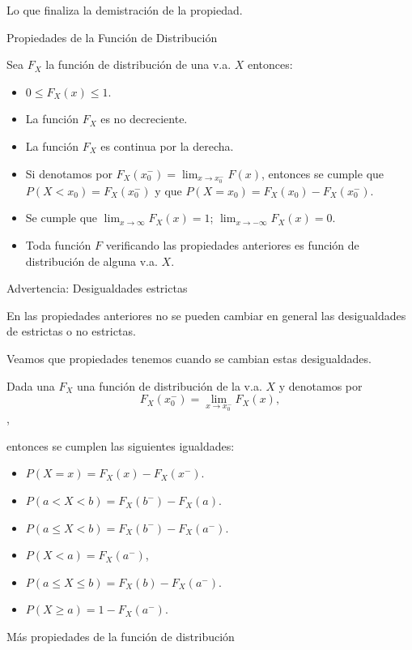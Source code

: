 \documentclass[
  letterpaper,
  DIV=11,
  numbers=noendperiod]{scrreprt}
\providecommand{\tightlist}{%
  \setlength{\itemsep}{0pt}\setlength{\parskip}{0pt}}\usepackage{longtable,booktabs,array}
\begin{document}
Lo que finaliza la demistración de la propiedad.

Propiedades de la Función de Distribución

Sea \(F_{X}\) la función de distribución de una v.a. \(X\) entonces:

\begin{itemize}
\tightlist
\item
  \(0\leq F_{X}(x)\leq 1\).
\item
  La función \(F_{X}\) es no decreciente.
\item
  La función \(F_{X}\) es continua por la derecha.
\item
  Si denotamos por
  \(F_X(x_0^{-})=\displaystyle \lim_{x\to x_0^{-}} F(x)\), entonces se
  cumple que \(P(X< x_0)=F_X(x_0^{-})\) y que
  \(P(X=x_0)=F_X(x_0)-F_X(x_0^{-})\).
\item
  Se cumple que \(\displaystyle \lim_{x\to\infty} F_{X}(x)=1\);
  \(\displaystyle \lim_{x\to-\infty}F_{X}(x)=0\).
\item
  Toda función \(F\) verificando las propiedades anteriores es función
  de distribución de alguna v.a. \(X\).
\end{itemize}

Advertencia: Desigualdades estrictas

En las propiedades anteriores no se pueden cambiar en general las
desigualdades de estrictas o no estrictas.

Veamos que propiedades tenemos cuando se cambian estas desigualdades.

Dada una \(F_{X}\) una función de distribución de la v.a. \(X\) y
denotamos por
\[F_{X}(x_0^{-})=\displaystyle \lim_{x\to x_0^{-}} F_{X}(x),\],

entonces se cumplen las siguientes igualdades:

\begin{itemize}
\tightlist
\item
  \(P(X=x)=F_{X}(x)-F_{X}(x^{-})\).
\item
  \(P(a< X< b)=F_{X}(b^{-})-F_{X}(a)\).
\item
  \(P(a\leq X< b)=F_{X}(b^{-})-F_{X}(a^{-})\).
\item
  \(P(X<a)=F_{X}(a^{-})\),
\item
  \(P(a\leq X\leq b)=F_{X}(b)-F_{X}(a^{-})\).
\item
  \(P(X\geq a)=1-F_{X}(a^{-})\).
\end{itemize}

Más propiedades de la función de distribución
\end{document}
